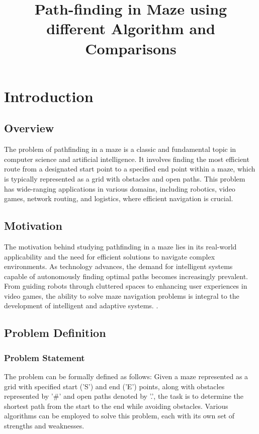 \documentclass[12pt]{report}
\title{Path-finding in Maze using different Algorithm and Comparisons }
\begin{document}
    
    \tableofcontents
  


\newpage
\chapter{Introduction}

\section{Overview}
The problem of pathfinding in a maze is a classic and fundamental topic in computer science and artificial intelligence. It involves finding the most efficient route from a designated start point to a specified end point within a maze, which is typically represented as a grid with obstacles and open paths. This problem has wide-ranging applications in various domains, including robotics, video games, network routing, and logistics, where efficient navigation is crucial.

\section{Motivation}
The motivation behind studying pathfinding in a maze lies in its real-world applicability and the need for efficient solutions to navigate complex environments. As technology advances, the demand for intelligent systems capable of autonomously finding optimal paths becomes increasingly prevalent. From guiding robots through cluttered spaces to enhancing user experiences in video games, the ability to solve maze navigation problems is integral to the development of intelligent and adaptive systems. \cite{farokhzad2009impact}.

\section{Problem Definition}

\subsection{Problem Statement}
The problem can be formally defined as follows: Given a maze represented as a grid with specified start ('S') and end ('E') points, along with obstacles represented by '#' and open paths denoted by '.', the task is to determine the shortest path from the start to the end while avoiding obstacles. Various algorithms can be employed to solve this problem, each with its own set of strengths and weaknesses.
\end{document}
